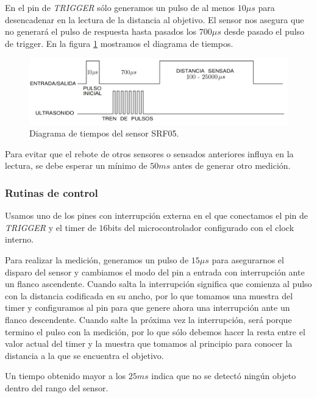 En el pin de \emph{TRIGGER} s\'olo generamos un pulso de al menos $10\mu s$ para desencadenar en la lectura de la distancia al objetivo.
El sensor nos asegura que no generar\'a el pulso de respuesta hasta pasados los $700\mu s$ desde pasado el pulso de trigger.
En la figura \ref{hF_srf05_pulse} mostramos el diagrama de tiempos.

\begin{figure}[ht]
	\centering
	\includegraphics[scale=0.25]{srf05_pulse.png}
	\caption{Diagrama de tiempos del sensor SRF05.}
	\label{hF_srf05_pulse}
\end{figure}

Para evitar que el rebote de otros sensores o sensados anteriores influya en la lectura, se debe esperar un m\'inimo de $50ms$ antes de
generar otro medici\'on.

\subsubsection{Rutinas de control}
\label{h_sensado_ultrasonido_rutinas}

Usamos uno de los pines con interrupci\'on externa en el que conectamos el pin de \emph{TRIGGER} y el timer de $16$bits del microcontrolador
configurado con el clock interno.

Para realizar la medici\'on, generamos un pulso de $15\mu s$ para asegurarnos el disparo del sensor y cambiamos el modo del pin a entrada con
interrupci\'on ante un flanco ascendente.
Cuando salta la interrupci\'on significa que comienza al pulso con la distancia codificada en su ancho, por lo que tomamos una muestra del
timer y configuramos al pin para que genere ahora una interrupci\'on ante un flanco descendente.
Cuando salte la pr\'oxima vez la interrupci\'on, ser\'a porque termino el pulso con la medici\'on, por lo que s\'olo debemos hacer la resta
entre el valor actual del timer y la muestra que tomamos al principio para conocer la distancia a la que se encuentra el objetivo.

Un tiempo obtenido mayor a los $25ms$ indica que no se detect\'o ning\'un objeto dentro del rango del sensor.

